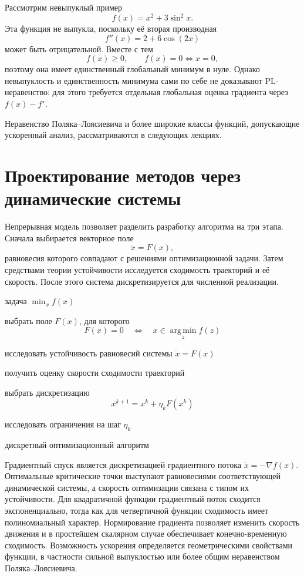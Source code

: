 Рассмотрим невыпуклый пример
\[
    f(x)=x^2+3\sin^2x.
\]
Эта функция не выпукла, поскольку её вторая производная
\[
    f''(x)=2+6\cos(2x)
\]
может быть отрицательной. Вместе с тем
\[
    f(x)\ge0,
    \qquad
    f(x)=0
    \Longleftrightarrow
    x=0,
\]
поэтому она имеет единственный глобальный минимум в нуле. Однако
невыпуклость и единственность минимума сами по себе не доказывают
PL-неравенство: для этого требуется отдельная глобальная оценка
градиента через \(f(x)-f^\star\).

Неравенство Поляка--Лоясиевича и более широкие классы функций,
допускающие ускоренный анализ, рассматриваются в следующих лекциях.

\section{Проектирование методов через динамические системы}

Непрерывная модель позволяет разделить разработку алгоритма на три
этапа. Сначала выбирается векторное поле
\[
    \dot{x}=F(x),
\]
равновесия которого совпадают с решениями оптимизационной задачи.
Затем средствами теории устойчивости исследуется сходимость
траекторий и её скорость. После этого система дискретизируется для
численной реализации.

\begin{algorithm}[H]
\caption{Проектирование оптимизационного метода через непрерывную модель}
\label{alg:continuous-design}
\begin{algorithmic}[1]

\Require
задача \(\min_x f(x)\)

\State
выбрать поле \(F(x)\), для которого
\[
    F(x)=0
    \quad\Longleftrightarrow\quad
    x\in\operatorname*{arg\,min}_{z}f(z)
\]

\State
исследовать устойчивость равновесий системы
\(\dot{x}=F(x)\)

\State
получить оценку скорости сходимости траекторий

\State
выбрать дискретизацию
\[
    x^{k+1}=x^k+\eta_kF(x^k)
\]

\State
исследовать ограничения на шаг \(\eta_k\)

\Ensure
дискретный оптимизационный алгоритм

\end{algorithmic}
\end{algorithm}


Градиентный спуск является дискретизацией градиентного потока
\(\dot{x}=-\nabla f(x)\). Оптимальные критические точки выступают
равновесиями соответствующей динамической системы, а скорость
оптимизации связана с типом их устойчивости. Для квадратичной функции
градиентный поток сходится экспоненциально, тогда как для четвертичной
функции сходимость имеет полиномиальный характер. Нормирование
градиента позволяет изменить скорость движения и в простейшем
скалярном случае обеспечивает конечно-временную сходимость. Возможность
ускорения определяется геометрическими свойствами функции, в
частности сильной выпуклостью или более общим неравенством
Поляка--Лоясиевича.
